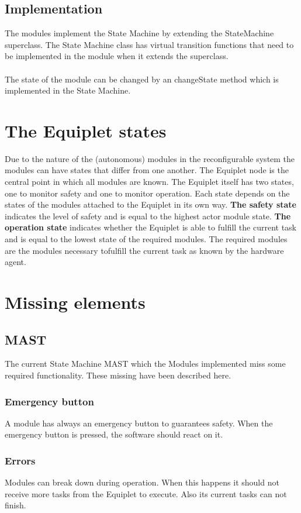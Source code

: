 \documentclass[12pt,a4paper]{report}
\begin{document}
\subsection{Implementation}
The modules implement the State Machine by extending the StateMachine superclass. The State Machine class has virtual transition functions that need to be implemented in the module when it extends the superclass.
\\\\
The state of the module can be changed by an changeState method which is implemented in the State Machine.

\section{The Equiplet states}
Due to the nature of the (autonomous) modules in the reconfigurable system the modules can have states that differ from one another. The Equiplet node is the central point in which all modules are known. The Equiplet itself has two states, one to monitor safety and one to monitor operation. Each state depends on the states of the modules attached to the Equiplet in its own
way.
\textbf{The safety state} indicates the level of safety and is equal to the highest actor module state.
\textbf{The operation state} indicates whether the Equiplet is able to fulfill the current task and is equal to the lowest state of the required modules. The required modules are the modules necessary tofulfill the current task as known by the hardware agent.\cite{mast_funcional_design}

\section{Missing elements}
\subsection{MAST}
The current State Machine MAST which the Modules implemented miss some required functionality. These missing have been described here.
\subsubsection{Emergency button}
A module has always an emergency button to guarantees safety. When the emergency button is pressed, the software should react on it.
\subsubsection{Errors}
Modules can break down during operation. When this happens it should not receive more tasks from the Equiplet to execute. Also its current tasks can not finish.
\end{document}
